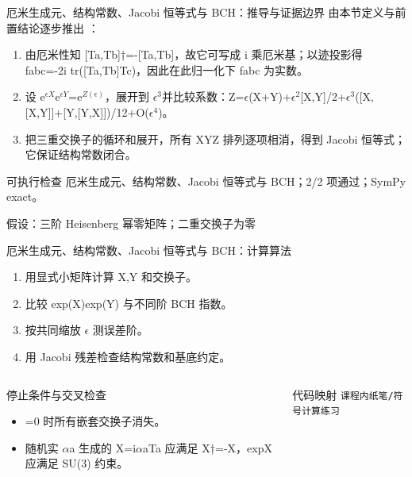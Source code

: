 \begin{frame}[t]{厄米生成元、结构常数、Jacobi 恒等式与 BCH：推导与证据边界}
\footnotesize
{}\quad 由本节定义与前置结论逐步推出 ：
\begin{enumerate}
\item 由厄米性知 [Ta,Tb]†=-[Ta,Tb]，故它可写成 i 乘厄米基；以迹投影得 fabc=-2i tr([Ta,Tb]Tc)，因此在此归一化下 fabc 为实数。
\item 设 e\ensuremath{^{\epsilon{}X}}e\ensuremath{^{\epsilon{}Y}}=e\ensuremath{^{Z(\epsilon)}}，展开到 \ensuremath{\epsilon}\ensuremath{^{3}}并比较系数：Z=\ensuremath{\epsilon}(X+Y)+\ensuremath{\epsilon}\ensuremath{^{2}}[X,Y]/\allowbreak{}2+\ensuremath{\epsilon}\ensuremath{^{3}}([X,[X,Y]]+[Y,[Y,X]])/\allowbreak{}12+O(\ensuremath{\epsilon}\ensuremath{^{4}})。
\item 把三重交换子的循环和展开，所有 XYZ 排列逐项相消，得到 Jacobi 恒等式；它保证结构常数闭合。
\end{enumerate}\begin{block}{可执行检查}
\quad 厄米生成元、结构常数、Jacobi 恒等式与 BCH；2/2 项通过；SymPy exact。
\par\scriptsize 假设：三阶 Heisenberg 幂零矩阵；二重交换子为零
\end{block}
\end{frame}

\begin{frame}[t]{厄米生成元、结构常数、Jacobi 恒等式与 BCH：计算算法}
\footnotesize
{}\begin{enumerate}
\item 用显式小矩阵计算 X,Y 和交换子。
\item 比较 exp(X)exp(Y) 与不同阶 BCH 指数。
\item 按共同缩放 \ensuremath{\epsilon} 测误差阶。
\item 用 Jacobi 残差检查结构常数和基底约定。
\end{enumerate}\begin{columns}[T,onlytextwidth]
\begin{block}{停止条件与交叉检查}\scriptsize\begin{itemize}
\item[\CheckMark] [X,Y]=0 时所有嵌套交换子消失。
\item[\CheckMark] 随机实 \ensuremath{\alpha}a 生成的 X=i\ensuremath{\alpha}aTa 应满足 X†=-X，expX 应满足 SU(3) 约束。
\end{itemize}\end{block}
\begin{block}{代码映射}
\scriptsize \texttt{课程内纸笔/\allowbreak{}符号计算练习}
\end{block}\end{columns}\end{frame}


